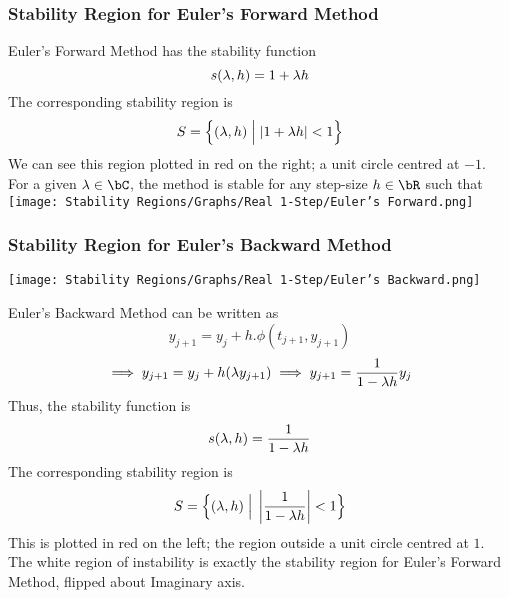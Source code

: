 \subsubsection{Stability Region for Euler's Forward Method}
\begin{multicols}{2}
\vspace*{\fill}

Euler's Forward Method has the stability function
\[s(\lambda, h) = 1 + \lambda h\]
The corresponding stability region is 
\[S = \Big\{ (\lambda, h) \;\Big|\; |1 + \lambda h| < 1\Big\}\]
We can see this region plotted in red on the right; a unit circle centred at $-1$.\\
For a given $\lambda \in \bC$, the method is stable for any step-size $h \in \bR$ such that\\

\vspace*{\fill}
\columnbreak{}
\texttt{[image: Stability Regions/Graphs/Real 1-Step/Euler's Forward.png]} 
\end{multicols}

\subsubsection{Stability Region for Euler's Backward Method}
\begin{multicols}{2}
\texttt{[image: Stability Regions/Graphs/Real 1-Step/Euler's Backward.png]}
\columnbreak{}
\vspace*{\fill}

Euler's Backward Method can be written as
\[y_{j+1} = y_j + h.\phi(t_{j+1}, y_{j+1})\]
\[\implies y_{j+1} = y_j + h(\lambda y_{j+1}) \implies y_{j+1} = \frac{1}{1 - \lambda h}y_j\]
Thus, the stability function is
\[s(\lambda, h) = \frac{1}{1 - \lambda h}\]
The corresponding stability region is
\[S = \Big\{ (\lambda, h) \;\Big|\; \left|\frac{1}{1 - \lambda h}\right| < 1\Big\}\]
This is plotted in red on the left; the region outside a unit circle centred at $1$.\\
The white region of instability is exactly the stability region for Euler's Forward Method, flipped about Imaginary axis.\\
\vspace*{\fill}
\end{multicols}

